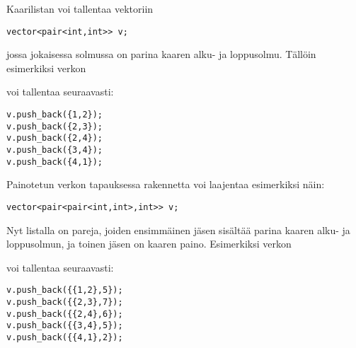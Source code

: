 Kaarilistan voi tallentaa vektoriin
\begin{lstlisting}
vector<pair<int,int>> v;
\end{lstlisting}
jossa jokaisessa solmussa on parina kaaren
alku- ja loppusolmu.
Tällöin esimerkiksi verkon

\begin{center}
\end{center}
voi tallentaa seuraavasti:
\begin{lstlisting}
v.push_back({1,2});
v.push_back({2,3});
v.push_back({2,4});
v.push_back({3,4});
v.push_back({4,1});
\end{lstlisting}

\noindent
Painotetun verkon tapauksessa rakennetta voi laajentaa
esimerkiksi näin:
\begin{lstlisting}
vector<pair<pair<int,int>,int>> v;
\end{lstlisting}
Nyt listalla on pareja, joiden ensimmäinen jäsen
sisältää parina kaaren alku- ja loppusolmun,
ja toinen jäsen on kaaren paino.
Esimerkiksi verkon

\begin{center}
\end{center}
\begin{samepage}
voi tallentaa seuraavasti:
\begin{lstlisting}
v.push_back({{1,2},5});
v.push_back({{2,3},7});
v.push_back({{2,4},6});
v.push_back({{3,4},5});
v.push_back({{4,1},2});
\end{lstlisting}
\end{samepage}

